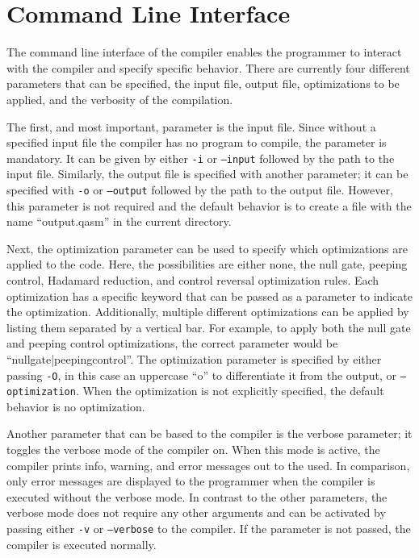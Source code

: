 \section{Command Line Interface}
The command line interface of the compiler enables the programmer to interact with the compiler and specify specific behavior. There are currently four different parameters that can be specified, the input file, output file, optimizations to be applied, and the verbosity of the compilation. 

The first, and most important, parameter is the input file. Since without a specified input file the compiler has no program to compile, the parameter is mandatory. It can be given by either \texttt{-i} or \texttt{--input} followed by the path to the input file. Similarly, the output file is specified with another parameter; it can be specified with \texttt{-o} or \texttt{--output} followed by the path to the output file.  However, this parameter is not required and the default behavior is to create a file with the name ``output.qasm'' in the current directory.

Next, the optimization parameter can be used to specify which optimizations are applied to the code. Here, the possibilities are either none, the null gate, peeping control, Hadamard reduction, and control reversal optimization rules. Each optimization has a specific keyword that can be passed as a parameter to indicate the optimization. Additionally, multiple different optimizations can be applied by listing them separated by a vertical bar.
For example, to apply both the null gate and peeping control optimizations, the correct parameter would be ``nullgate|peepingcontrol''. The optimization parameter is specified by either passing \texttt{-O}, in this case an uppercase ``o'' to differentiate it from the output, or \texttt{--optimization}. When the optimization is not explicitly specified, the default behavior is no optimization. 

Another parameter that can be based to the compiler is the verbose parameter; it toggles the verbose mode of the compiler on. When this mode is active, the compiler prints info, warning, and error messages out to the used. In comparison, only error messages are displayed to the programmer when the compiler is executed without the verbose mode. In contrast to the other parameters, the verbose mode does not require any other arguments and can be activated by passing either \texttt{-v} or \texttt{--verbose} to the compiler. If the parameter is not passed, the compiler is executed normally. 

